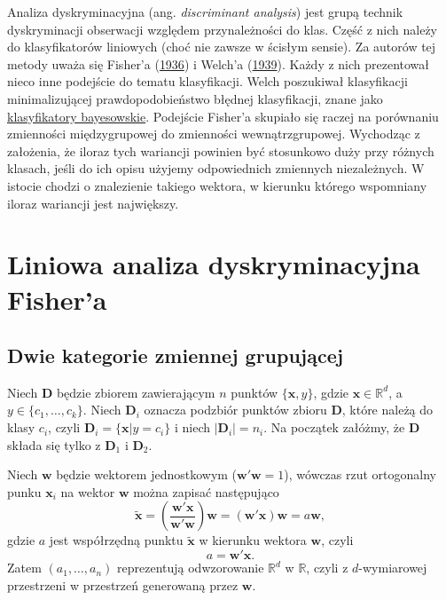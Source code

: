 \documentclass[
]{book}
\theoremstyle{plain}
\theoremstyle{definition}
\theoremstyle{definition}
\theoremstyle{definition}
\theoremstyle{definition}
\theoremstyle{remark}
\begin{document}
Analiza dyskryminacyjna (ang. \emph{discriminant analysis}) jest grupą technik dyskryminacji obserwacji względem przynależności do klas. Część z nich należy do klasyfikatorów liniowych (choć nie zawsze w ścisłym sensie). Za autorów tej metody uważa się Fisher'a (\protect\hyperlink{ref-fisher1936}{1936}) i Welch'a (\protect\hyperlink{ref-welch1939}{1939}). Każdy z nich prezentował nieco inne podejście do tematu klasyfikacji. Welch poszukiwał klasyfikacji minimalizującej prawdopodobieństwo błędnej klasyfikacji, znane jako \protect\hyperlink{bayes}{klasyfikatory bayesowskie}. Podejście Fisher'a skupiało się raczej na porównaniu zmienności międzygrupowej do zmienności wewnątrzgrupowej. Wychodząc z założenia, że iloraz tych wariancji powinien być stosunkowo duży przy różnych klasach, jeśli do ich opisu użyjemy odpowiednich zmiennych niezależnych. W istocie chodzi o znalezienie takiego wektora, w kierunku którego wspomniany iloraz wariancji jest największy.

\hypertarget{liniowa-analiza-dyskryminacyjna-fishera}{%
\section{Liniowa analiza dyskryminacyjna Fisher'a}\label{liniowa-analiza-dyskryminacyjna-fishera}}

\hypertarget{dwie-kategorie-zmiennej-grupujux105cej}{%
\subsection{Dwie kategorie zmiennej grupującej}\label{dwie-kategorie-zmiennej-grupujux105cej}}

Niech \(\boldsymbol D\) będzie zbiorem zawierającym \(n\) punktów \(\{\boldsymbol x, y\}\), gdzie \(\boldsymbol x\in \mathbb{R}^d\), a \(y\in \{c_1,\ldots,c_k\}\). Niech \(\boldsymbol D_i\) oznacza podzbiór punktów zbioru \(\boldsymbol D\), które należą do klasy \(c_i\), czyli \(\boldsymbol D_i=\{\boldsymbol x|y=c_i\}\) i niech \(|\boldsymbol D_i|=n_i\). Na początek załóżmy, że \(\boldsymbol D\) składa się tylko z \(\boldsymbol D_1\) i \(\boldsymbol D_2\).

Niech \(\boldsymbol w\) będzie wektorem jednostkowym (\(\boldsymbol w'\boldsymbol w=1\)), wówczas rzut ortogonalny punku \(\boldsymbol x_i\) na wektor \(\boldsymbol w\) można zapisać następująco
\begin{equation}
    \tilde{\boldsymbol x}=\left(\frac{\boldsymbol w'\boldsymbol x}{\boldsymbol w'\boldsymbol w}\right)\boldsymbol w=(\boldsymbol w'\boldsymbol x)\boldsymbol w = a\boldsymbol w,
\end{equation}
gdzie \(a\) jest współrzędną punktu \(\tilde{\boldsymbol x}\) w kierunku wektora \(\boldsymbol w\), czyli
\begin{equation}
    a=\boldsymbol w'\boldsymbol x.
\end{equation}
Zatem \((a_1,\ldots,a_n)\) reprezentują odwzorowanie \(\mathbb{R}^d\) w \(\mathbb{R}\), czyli z \(d\)-wymiarowej przestrzeni w przestrzeń generowaną przez \(\boldsymbol w\).
\end{document}
